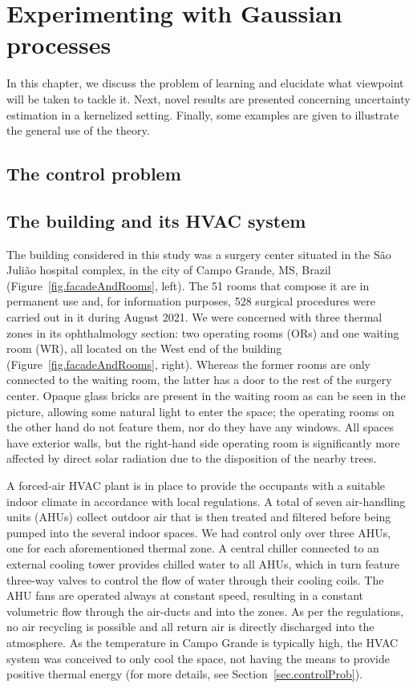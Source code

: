 \cleardoublepage
\chapter{Experimenting with Gaussian processes}

In this chapter, we discuss the problem of learning and elucidate what viewpoint will be taken to tackle it. Next, novel results are presented concerning uncertainty estimation in a kernelized setting. Finally, some examples are given to illustrate the general use of the theory.

\section{The control problem}

\section{The building and its HVAC system}

The building considered in this study was a surgery center situated in the São Julião hospital complex, in the city of Campo Grande, MS, Brazil (Figure~\ref{fig.facadeAndRooms}, left). The 51 rooms that compose it are in permanent use and, for information purposes, 528 surgical procedures were carried out in it during August 2021. We were concerned with three thermal zones in its ophthalmology section: two operating rooms (ORs) and one waiting room (WR), all located on the West end of the building (Figure~\ref{fig.facadeAndRooms}, right). Whereas the former rooms are only connected to the waiting room, the latter has a door to the rest of the surgery center. Opaque glass bricks are present in the waiting room as can be seen in the picture, allowing some natural light to enter the space; the operating rooms on the other hand do not feature them, nor do they have any windows. All spaces have exterior walls, but the right-hand side operating room is significantly more affected by direct solar radiation due to the disposition of the nearby trees.

A forced-air HVAC plant is in place to provide the occupants with a suitable indoor climate in accordance with local regulations. A total of seven air-handling units (AHUs) collect outdoor air that is then treated and filtered before being pumped into the several indoor spaces. We had control only over three AHUs, one for each aforementioned thermal zone. A central chiller connected to an external cooling tower provides chilled water to all AHUs, which in turn feature three-way valves to control the flow of water through their cooling coils. The AHU fans are operated always at constant speed, resulting in a constant volumetric flow through the air-ducts and into the zones. As per the regulations, no air recycling is possible and all return air is directly discharged into the atmosphere. As the temperature in Campo Grande is typically high, the HVAC system was conceived to only cool the space, not having the means to provide positive thermal energy (for more details, see Section~\ref{sec.controlProb}).

